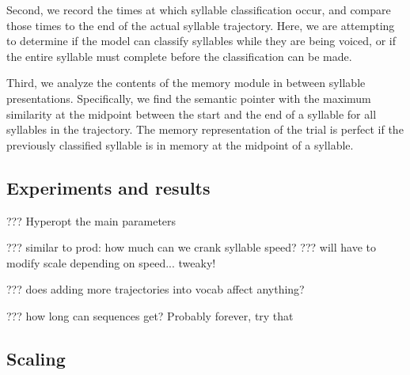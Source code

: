 Second, we record the times at which
syllable classification occur,
and compare those times
to the end of the actual syllable trajectory.
Here, we are attempting to determine
if the model can classify syllables
while they are being voiced,
or if the entire syllable must complete
before the classification can be made.

Third, we analyze the contents
of the memory module
in between syllable presentations.
Specifically,
we find the semantic pointer
with the maximum similarity
at the midpoint between
the start and the end of a syllable
for all syllables in the trajectory.
The memory representation of the trial
is perfect if the
previously classified syllable
is in memory at the midpoint
of a syllable.

\subsection{Experiments and results}

??? Hyperopt the main parameters

??? similar to prod: how much can we crank syllable speed?
??? will have to modify scale depending on speed... tweaky!

??? does adding more trajectories into vocab affect anything?

??? how long can sequences get? Probably forever, try that

\subsection{Scaling}

